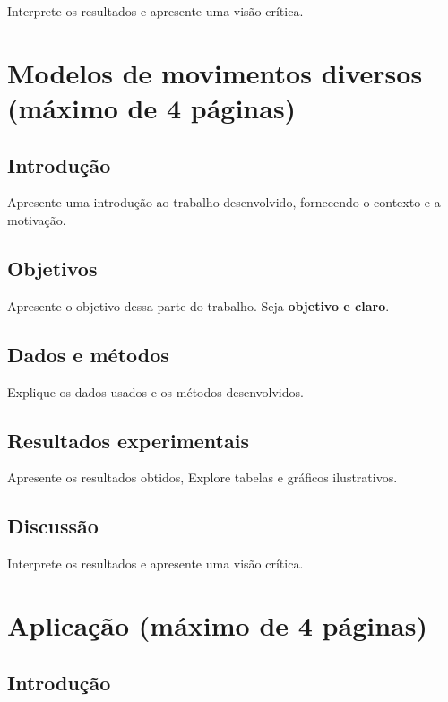 \documentclass{article}
\begin{document}
Interprete os resultados e apresente uma visão crítica.

\newpage

\section{Modelos de movimentos diversos (máximo de 4 páginas)}

\subsection{Introdução}

Apresente uma introdução ao trabalho desenvolvido, fornecendo o contexto e a motivação.

\subsection{Objetivos}

Apresente o objetivo dessa parte do trabalho. Seja {\bf objetivo e claro}.

\subsection{Dados e métodos}

Explique os dados usados e os métodos desenvolvidos.

\subsection{Resultados experimentais}

Apresente os resultados obtidos, Explore tabelas e gráficos ilustrativos.

\subsection{Discussão}

Interprete os resultados e apresente uma visão crítica.

\newpage

\section{Aplicação (máximo de 4 páginas)}

\subsection{Introdução}
\end{document}
